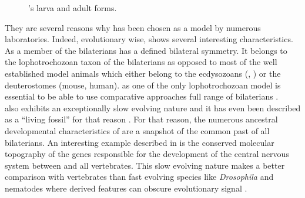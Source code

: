      
\begin{figure}[bth]
        \myfloatalign
         \quad
        \caption{\platyfull{}'s larva and adult forms.}\label{fig:platynereis}
\end{figure}
     
     They are several reasons why \platy{} has been chosen as a model by numerous laboratories. Indeed, evolutionary wise, \platy{} shows several interesting characteristics.  As a member of the bilaterians \platy{} has a defined bilateral symmetry. It belongs to the lophotrochozoan taxon of the bilaterians as opposed to most of the well established model animals which either belong to the ecdysozoans (, ) or the deuterostomes (mouse, human). \platy{} as one of the only lophotrochozoan model is essential to be able to use comparative approaches full range of bilaterians \cite{Fischer10}.\\
     
     \platy{} also exhibits an exceptionally slow evolving nature and it has even been described as a ``living fossil'' for that reason \cite{Fischer10}. For that reason, the numerous ancestral developmental characteristics of \platy{} are a snapshot of the common past of all bilaterians. An interesting example described in \cite{denes07,tessmar07} is the conserved molecular topography of the genes responsible for the development of the central nervous system between \platy{} and all vertebrates. This slow evolving nature makes \platy{} a better comparison with vertebrates than fast evolving species like \emph{Drosophila} and nematodes where derived features can obscure evolutionary signal \cite{Fischer10,arendt124}.\\
     
